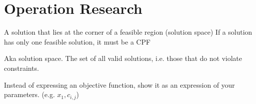 \section{Operation Research}
\begin{definition}
A solution that lies at the corner of a feasible region (solution space)
If a solution has only one feasible solution, it must be a CPF
\end{definition}

\begin{definition}
    Aka solution space. The set of all valid solutions, i.e. those that do not
    violate constraints.
\end{definition}

\begin{definition}
    Instead of expressing an objective function, show it as
    an expression of your parameters. (e.g. $x_{1}, c_{i,j}$)
\end{definition}

